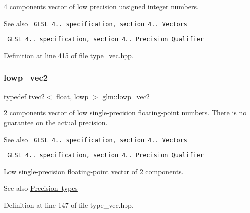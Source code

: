 4 components vector of low precision unsigned integer numbers.

\begin{DoxySeeAlso}{See also}
\href{http://www.opengl.org/registry/doc/GLSLangSpec.4.20.8.pdf}{\texttt{ G\+L\+SL 4.. specification, section 4.. Vectors}} 

\href{http://www.opengl.org/registry/doc/GLSLangSpec.4.20.8.pdf}{\texttt{ G\+L\+SL 4.. specification, section 4.. Precision Qualifier}} 
\end{DoxySeeAlso}


Definition at line 415 of file type\+\_\+vec.\+hpp.

\mbox{\label{group__core__precision_ga1b46182364e2054858f9e7a70f8c52bc}} 
\subsubsection{\texorpdfstring{lowp\_vec2}{lowp\_vec2}}
{\footnotesize\ttfamily typedef \mbox{\hyperlink{structglm_1_1tvec2}{tvec2}}$<$ float, \mbox{\hyperlink{namespaceglm_a0f04f086094c747d227af4425893f545ae161af3fc695e696ce3bf69f7332bc2d}{lowp}} $>$ \mbox{\hyperlink{group__core__precision_ga1b46182364e2054858f9e7a70f8c52bc}{glm\+::lowp\+\_\+vec2}}}

2 components vector of low single-\/precision floating-\/point numbers. There is no guarantee on the actual precision.

\begin{DoxySeeAlso}{See also}
\href{http://www.opengl.org/registry/doc/GLSLangSpec.4.20.8.pdf}{\texttt{ G\+L\+SL 4.. specification, section 4.. Vectors}} 

\href{http://www.opengl.org/registry/doc/GLSLangSpec.4.20.8.pdf}{\texttt{ G\+L\+SL 4.. specification, section 4.. Precision Qualifier}}
\end{DoxySeeAlso}
Low single-\/precision floating-\/point vector of 2 components. \begin{DoxySeeAlso}{See also}
\mbox{\hyperlink{group__core__precision}{Precision types}} 
\end{DoxySeeAlso}


Definition at line 147 of file type\+\_\+vec.\+hpp.

\mbox{\label{group__core__precision_ga0229a1c4abd7c51f15eeb7a0fec3846b}} 
